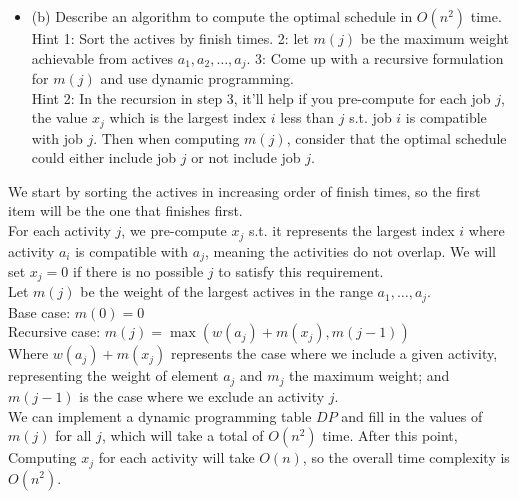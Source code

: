 \documentclass{article}
\begin{document}
\begin{enumerate}
\begin{itemize}
    \item (b) Describe an algorithm to compute the optimal schedule in $O(n^2)$ time. \\
    Hint 1: Sort the actives by finish times. 2: let $m(j)$ be the maximum weight achievable from actives $a_1, a_2, \dots, a_j$. 3: Come up with a recursive formulation for $m(j)$  and use dynamic programming. \\
    Hint 2: In the recursion in step 3, it'll help if you pre-compute for each job $j$, the value $x_j$ which is the largest index $i$ less than $j$ s.t. job $i$ is compatible with job $j$. Then when computing $m(j)$, consider that the optimal schedule could either include job $j$ or not include job $j$.
\end{itemize}
We start by sorting the actives in increasing order of finish times, so the first item will be the one that finishes first. \\
\newline 
For each activity $j$, we pre-compute $x_j$ s.t. it represents the largest index $i$ where activity $a_i$ is compatible with $a_j$, meaning the activities do not overlap. We will set $x_j = 0$ if there is no possible $j$ to satisfy this requirement. \\
\newline 
Let $m(j)$ be the weight of the largest actives in the range $a_1, \dots, a_j$. \\
Base case: $m(0) = 0$ \\
Recursive case: $m(j) = \max(w(a_j) + m(x_j), m(j-1))$ \\
Where $w(a_j) + m(x_j)$ represents the case where we include a given activity, representing the weight of element $a_j$ and $m_j$ the maximum weight; and $m(j-1)$ is the case where we exclude an activity $j$. \\
\newline 
We can implement a dynamic programming table $DP$ and fill in the values of $m(j)$ for all $j$, which will take a total of $O(n^2)$ time. After this point, Computing $x_j$ for each activity will take $O(n)$, so the overall time complexity is $O(n^2)$.







\end{enumerate}
\end{document}
